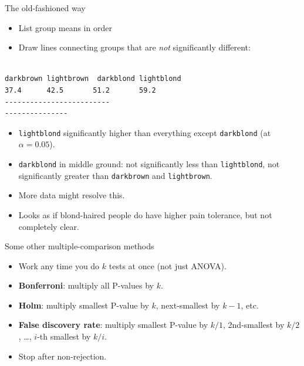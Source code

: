 \documentclass[ignorenonframetext,]{beamer}
\begin{document}
\begin{frame}[fragile]{The old-fashioned way}
\protect\hypertarget{the-old-fashioned-way}{}

\begin{itemize}
\item
  List group means in order
\item
  Draw lines connecting groups that are \emph{not} significantly
  different:
\end{itemize}

\begin{verbatim}

darkbrown lightbrown  darkblond lightblond
37.4      42.5       51.2       59.2
-------------------------
---------------
\end{verbatim}

\begin{itemize}
\item
  \texttt{lightblond} significantly higher than everything except
  \texttt{darkblond} (at \(\alpha=0.05\)).
\item
  \texttt{darkblond} in middle ground: not significantly less than
  \texttt{lightblond}, not significantly greater than \texttt{darkbrown}
  and \texttt{lightbrown}.
\item
  More data might resolve this.
\item
  Looks as if blond-haired people do have higher pain tolerance, but not
  completely clear.
\end{itemize}

\end{frame}

\begin{frame}{Some other multiple-comparison methods}
\protect\hypertarget{some-other-multiple-comparison-methods}{}

\begin{itemize}
\item
  Work any time you do \(k\) tests at once (not just ANOVA).
\item
  \textbf{Bonferroni}: multiply all P-values by \(k\).
\item
  \textbf{Holm}: multiply smallest P-value by \(k\), next-smallest by
  \(k-1\), etc.
\item
  \textbf{False discovery rate}: multiply smallest P-value by \(k/1\),
  2nd-smallest by \(k/2\), \ldots, \(i\)-th smallest by \(k/i\).
\item
  Stop after non-rejection.
\end{itemize}

\end{frame}
\end{document}
